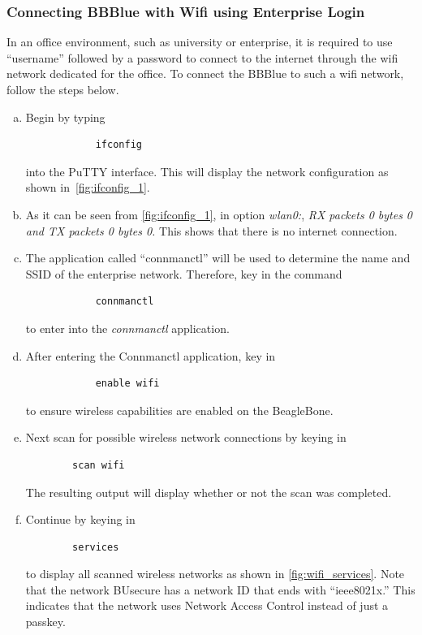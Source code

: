 \subsubsection{Connecting BBBlue with Wifi using Enterprise Login}

In an office environment, such as university or enterprise, it is required to
use ``username'' followed by a password to connect to the internet through the
wifi network dedicated for the office. To connect the BBBlue to such a wifi
network, follow the steps below.

\begin{enumerate}[a)]
    \item Begin by typing 
         \begin{verbatim}
            ifconfig
         \end{verbatim}
         into the PuTTY interface. This will display the network configuration as shown in~\autoref{fig:ifconfig_1}.

\item As it can be seen from \autoref{fig:ifconfig_1}, in option \emph{wlan0:},
  \emph{RX packets 0 bytes 0 and TX packets 0 bytes 0.} This shows that there is
  no internet connection.

  
\item The application called ``connmanctl'' will be used to determine the name and SSID of the enterprise network. Therefore, key in the command
        \begin{verbatim}
            connmanctl
        \end{verbatim}
    to enter into the \emph{connmanctl} application.
    
    \item After entering the Connmanctl application, key in
        \begin{verbatim}
            enable wifi
        \end{verbatim}
    to ensure wireless capabilities are enabled on the BeagleBone.
    
    \item Next scan for possible wireless network connections by keying in
    \begin{verbatim}
        scan wifi
    \end{verbatim}
    The resulting output will display whether or not the scan was completed.
    \item Continue by keying in
    \begin{verbatim}
        services
    \end{verbatim}
    to display all scanned wireless networks as shown in \autoref{fig:wifi_services}. Note that the network BUsecure has a network ID that ends with ``ieee8021x.'' This indicates that the network uses Network Access Control instead of just a passkey.


\end{enumerate}
